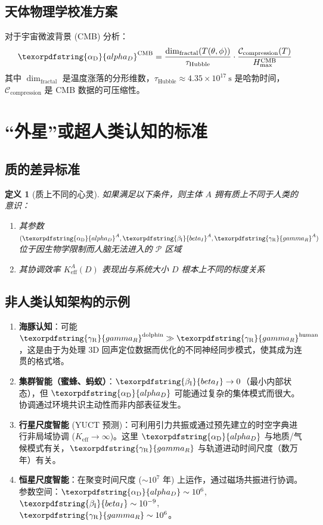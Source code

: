 \documentclass[11pt,a4paper]{article}
\newtheorem{definition}{定义}
\DeclareRobustCommand{\alD}{\texorpdfstring{\ensuremath{\alpha_{\mathrm{D}}}}{alpha_D}}
\DeclareRobustCommand{\beI}{\texorpdfstring{\ensuremath{\beta_{\mathrm{I}}}}{beta_I}}
\DeclareRobustCommand{\gaR}{\texorpdfstring{\ensuremath{\gamma_{\mathrm{R}}}}{gamma_R}}
\newcommand{\eff}{\mathrm{eff}}
\newcommand{\Ke}{K_{\eff}}
\begin{document}
	\subsection{天体物理学校准方案}
	\label{subsec:astro-calibration}
	
	对于宇宙微波背景 (CMB) 分析：
	\[
	\alD^{\mathrm{CMB}} = \frac{\dim_{\mathrm{fractal}}(T(\theta,\phi))}{\tau_{\mathrm{Hubble}}} \cdot \frac{\mathcal{C}_{\mathrm{compression}}(T)}{H_{\max}^{\mathrm{CMB}}}
	\]
	其中 \(\dim_{\mathrm{fractal}}\) 是温度涨落的分形维数，\(\tau_{\mathrm{Hubble}} \approx 4.35 \times 10^{17}\ \mathrm{s}\) 是哈勃时间，\(\mathcal{C}_{\mathrm{compression}}\) 是 CMB 数据的可压缩性。
	
	\section{“外星”或超人类认知的标准}
	
	\subsection{质的差异标准}
	
	\begin{definition}[质上不同的心灵]
		如果满足以下条件，则主体 \(A\) 拥有质上不同于人类的意识：
		\begin{enumerate}
			\item 其参数 \((\alD^A, \beI^A, \gaR^A)\) 位于因生物学限制而人脑无法进入的 \(\mathcal{P}\) 区域
			\item 其协调效率 \(\Ke^A(D)\) 表现出与系统大小 \(D\) 根本上不同的标度关系
		\end{enumerate}
	\end{definition}
	
	\subsection{非人类认知架构的示例}
	
	\begin{enumerate}
		\item \textbf{海豚认知}：可能 \(\gaR^{\mathrm{dolphin}} \gg \gaR^{\mathrm{human}}\)，这是由于为处理 3D 回声定位数据而优化的不同神经同步模式，使其成为连贯的格式塔。
		
		\item \textbf{集群智能（蜜蜂、蚂蚁）}：\(\beI \to 0\)（最小内部状态），但 \(\alD\) 可能通过复杂的集体模式而很大。协调通过环境共识主动性而非内部表征发生。
		
		\item \textbf{行星尺度智能} (YUCT 预测)：可利用引力共振或通过预先建立的时空字典进行非局域协调 (\(\Ke \to \infty\))。这里 \(\alD\) 与地质/气候模式有关，\(\gaR\) 与轨道进动时间尺度（数万年）有关。
		
		\item \textbf{恒星尺度智能}：在聚变时间尺度 (\(\sim 10^7\) 年) 上运作，通过磁场共振进行协调。参数空间：\(\alD \sim 10^6\), \(\beI \sim 10^{-9}\), \(\gaR \sim 10^6\)。
	\end{enumerate}
	
\end{document}
